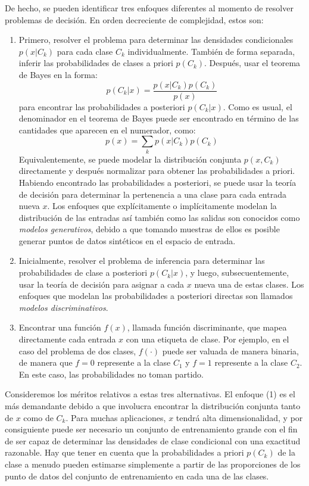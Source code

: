 	De hecho, se pueden identificar tres enfoques diferentes al momento de resolver problemas de decisión. En orden decreciente de complejidad, estos son:
		\begin{enumerate}
			\item Primero, resolver el problema para determinar las densidades condicionales $p(x \vert C_k)$ para cada clase $C_k$ individualmente. También de forma separada, inferir las probabilidades de clases a priori $p(C_k)$. Después, usar el teorema de Bayes en la forma:
			$$p(C_k \vert x) = \frac{p(x \vert C_k)p(C_k)}{p(x)} $$
			para encontrar las probabilidades a posteriori $p(C_k \vert x)$. Como es usual, el denominador en el teorema de Bayes puede ser encontrado en término de las cantidades que aparecen en el numerador, como:
			 $$p(x) = \sum_k p(x \vert C_k)p(C_k) $$
			Equivalentemente, se puede modelar la distribución conjunta $p(x,C_k)$ directamente y después normalizar para obtener las probabilidades a priori. Habiendo encontrado las probabilidades a posteriori, se puede usar la teoría de decisión para determinar la pertenencia a una clase para cada entrada nueva $x$. Los enfoques que explícitamente o implícitamente modelan la distribución de las entradas así también como las salidas son conocidos como \textit{modelos generativos}, debido a que tomando muestras de ellos es posible generar puntos de datos sintéticos en el espacio de entrada.
			\item Inicialmente, resolver el problema de inferencia para determinar las  probabilidades de clase a posteriori $p(C_k \vert x)$, y luego, subsecuentemente, usar la teoría de decisión para asignar a cada $x$ nueva una de estas clases. Los enfoques que modelan las probabilidades a posteriori directas son llamados \textit{modelos discriminativos}.
			\item Encontrar una función $f(x)$, llamada función discriminante, que mapea directamente cada entrada $x$ con una etiqueta de clase. Por ejemplo, en el caso del problema de dos clases, $f(\cdot)$ puede ser valuada de manera binaria, de manera que $f = 0$ represente a la clase $C_1$ y $f = 1$ represente a la clase $C_2$. En este caso, las probabilidades no toman partido. 
		\end{enumerate}
		
	Consideremos los méritos relativos a estas tres alternativas. El enfoque (1) es el más demandante debido a que involucra encontrar la distribución conjunta tanto de $x$ como de $C_k$. Para muchas aplicaciones, $x$ tendrá alta dimensionalidad, y por consiguiente puede ser necesario un conjunto de entrenamiento grande con el fin de ser capaz de determinar las densidades de clase condicional con una exactitud razonable. Hay que tener en cuenta que la probabilidades a priori $p(C_k)$ de la clase a menudo pueden estimarse simplemente a partir de las proporciones de los punto de datos del conjunto de entrenamiento en cada una de las clases.
		
